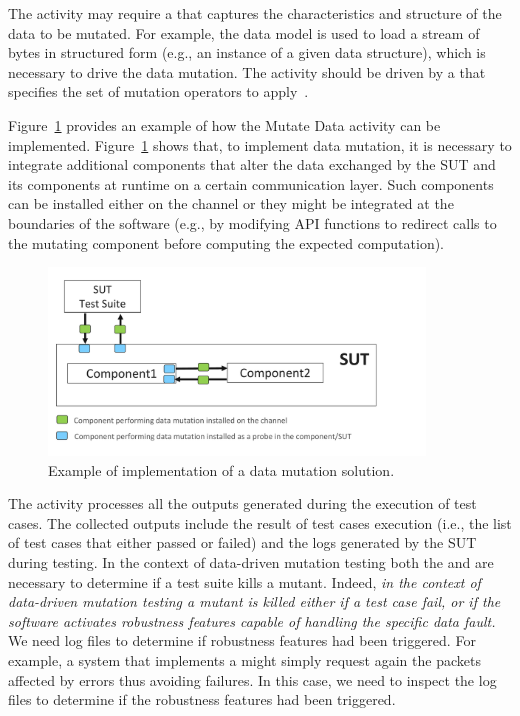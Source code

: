 The activity  may require a  that captures the characteristics and structure of the data to be mutated. 
For example, the data model is used to load a stream of bytes in structured form (e.g., an instance of a given data structure), which is necessary to drive the data mutation. 
The activity  should be driven by a  that specifies the set of mutation operators to apply~\cite{di2015generating}. 

Figure~\ref{fig:data:mutateData} provides an example of how the Mutate Data activity can be implemented. Figure~\ref{fig:data:mutateData} shows that, to implement data mutation, it is necessary to integrate additional components that alter the data exchanged by the SUT and its components at runtime on a certain communication layer. Such components can be installed either on the channel or they might be integrated at the boundaries of the software (e.g., by modifying API functions to redirect calls to the mutating component before computing the expected computation).

	\begin{figure}
	\centering
		\includegraphics[width=10cm]{images/dataMutationExample}
		\caption{Example of implementation of a data mutation solution.}
		\label{fig:data:mutateData}
	\end{figure}


The activity  processes all the outputs generated during the execution of test cases.
The collected outputs include the result of test cases execution (i.e., the list of test cases that either passed or failed) and the logs generated by the SUT during testing.
In the context of data-driven mutation testing both the  and  are necessary to determine if a test suite kills a mutant.
Indeed, \emph{in the context of data-driven mutation testing a mutant is killed either if a test case fail, or if the software activates robustness features capable of handling the specific data fault.}
We need log files to determine if robustness features had been triggered.
For example, a system that implements a  might simply request again the packets affected by errors thus avoiding failures. In this case, we need to inspect the log files to determine if the robustness features had been triggered.

